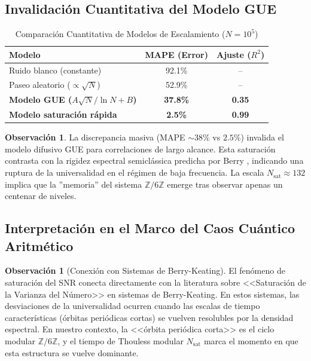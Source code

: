 \documentclass[12pt, a4paper]{article}
\theoremstyle{plain}
\theoremstyle{definition}
\newtheorem{observacion}[teorema]{Observación}
\theoremstyle{remark}
\newcommand{\Z}{\mathbb{Z}}
\begin{document}
\subsection{Invalidación Cuantitativa del Modelo GUE}
\label{subsec:invalidacion_gue}

\begin{table}[H]
\centering
\caption{Comparación Cuantitativa de Modelos de Escalamiento ($N=10^5$)}
\label{tab:modelos_snr}
\begin{tabular}{@{}lcc@{}}
\toprule
\textbf{Modelo} & \textbf{MAPE (Error)} & \textbf{Ajuste ($R^2$)} \\
\midrule
Ruido blanco (constante) & 92.1\% & -- \\
Paseo aleatorio ($\propto \sqrt{N}$) & 52.9\% & -- \\
\textbf{Modelo GUE ($A\sqrt{N}/\ln N + B$)} & \textbf{37.8\%} & \textbf{0.35} \\
\textbf{Modelo saturación rápida} & \textbf{2.5\%} & \textbf{0.99} \\
\bottomrule
\end{tabular}
\end{table}

\begin{observacion}
La discrepancia masiva (MAPE $\sim 38\%$ vs $2.5\%$) invalida el modelo difusivo GUE para correlaciones de largo alcance. Esta saturación contrasta con la rigidez espectral semiclássica predicha por Berry \cite{berry1985}, indicando una ruptura de la universalidad en el régimen de baja frecuencia. La escala $N_{\text{sat}} \approx 132$ implica que la ''memoria'' del sistema $\Z/6\Z$ emerge tras observar apenas un centenar de niveles.
\end{observacion}


\subsection{Interpretación en el Marco del Caos Cuántico Aritmético}
\label{subsec:caos_cuantico_interpretacion}

\begin{observacion}[Conexión con Sistemas de Berry-Keating]
\label{obs:conexion_berry_keating}
El fenómeno de saturación del SNR conecta directamente con la literatura sobre 
<<Saturación de la Varianza del Número>> en sistemas de Berry-Keating. En estos 
sistemas, las desviaciones de la universalidad ocurren cuando las escalas de 
tiempo características (órbitas periódicas cortas) se vuelven resolubles por 
la densidad espectral. En nuestro contexto, la <<órbita periódica corta>> es el 
ciclo modular $\mathbb{Z}/6\mathbb{Z}$, y el tiempo de Thouless modular 
$N_{\text{sat}}$ marca el momento en que esta estructura se vuelve dominante.
\end{observacion}
\end{document}
